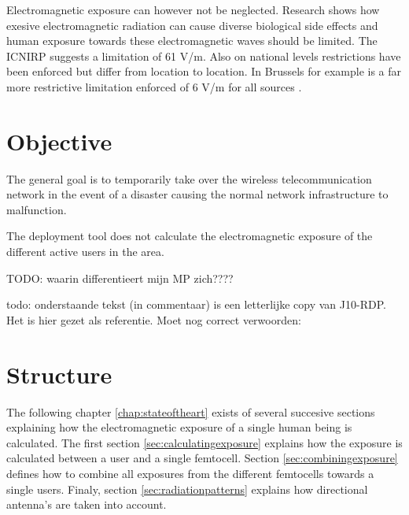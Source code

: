 Electromagnetic exposure can however not be neglected. Research shows how exesive electromagnetic radiation can cause diverse biological side effects \cite{bioeffects} and human exposure towards these electromagnetic waves should be limited. The \gls{ICNIRP} 
suggests a limitation of 61 V/m. Also on national levels restrictions have been enforced but differ from location to location. In Brussels for example is a far more restrictive limitation enforced of 6 V/m for all sources \cite{J1, J5}.
\section{Objective}
\label{sec:objective}
The general goal is to temporarily take over the wireless telecommunication network in the event of a disaster causing the normal network infrastructure to malfunction.


The deployment tool does not calculate the electromagnetic exposure of the different active users in the area.

TODO: waarin differentieert mijn MP zich????

todo: onderstaande tekst (in commentaar) is een letterlijke copy van J10-RDP. Het is hier gezet als referentie. Moet nog correct verwoorden:

\section{Structure}
\label{sec:structure}

The following chapter \ref{chap:stateoftheart} exists of several succesive sections explaining how the electromagnetic exposure of a single human being is calculated. The first section \ref{sec:calculatingexposure}
explains how the exposure is calculated between a user and a single femtocell. Section \ref{sec:combiningexposure}  defines how to combine all exposures from the different femtocells towards a single users.
Finaly, section \ref{sec:radiationpatterns} explains how directional antenna's are taken into account.

